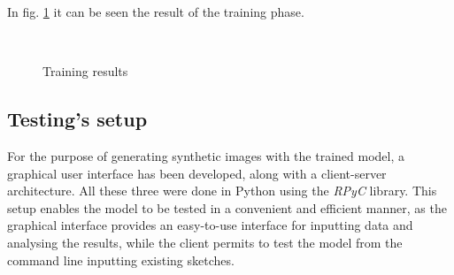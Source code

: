 In fig. \ref{fig:training results} it can be seen the result of the training phase.
\begin{figure}[htbp]
    \centering
     \quad
    \\
    \caption{Training results}
    \label{fig:training results}
\end{figure}
\subsection{Testing's setup}
For the purpose of generating synthetic images with the trained model, a graphical user interface has been developed, along with a client-server architecture. All these three were done in Python using the \textit{RPyC} library. This setup enables the model to be tested in a convenient and efficient manner, as the graphical interface provides an easy-to-use interface for inputting data and analysing the results, while the client permits to test the model from the command line inputting existing sketches.\\
